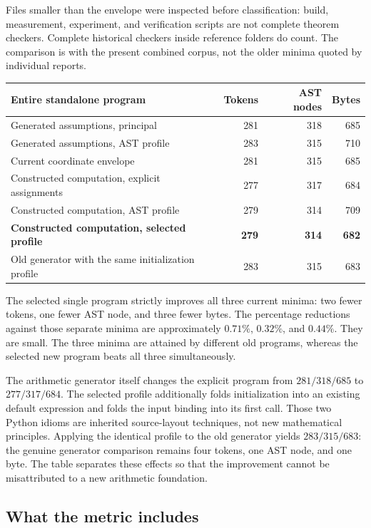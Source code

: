 \documentclass[11pt,letterpaper]{article}
\theoremstyle{definition}\newtheorem{definition}[theorem]{Definition}
\theoremstyle{remark}\newtheorem{remark}[theorem]{Remark}
\begin{document}
Files smaller than the envelope were inspected before classification:
build, measurement, experiment, and verification scripts are not complete
theorem checkers. Complete historical checkers inside reference folders
do count. The comparison is with the present combined corpus, not the
older minima quoted by individual reports.

\begin{center}\small
\begin{tabular}{lrrr}
\toprule
Entire standalone program & Tokens & AST nodes & Bytes\\
\midrule
Generated assumptions, principal\cite{generated} &281&318&685\\
Generated assumptions, AST profile\cite{generated}&283&315&710\\
Current coordinate envelope&281&315&685\\
\midrule
Constructed computation, explicit assignments&277&317&684\\
Constructed computation, AST profile&279&314&709\\
\textbf{Constructed computation, selected profile}&\textbf{279}&\textbf{314}&\textbf{682}\\
\midrule
Old generator with the same initialization profile&283&315&683\\
\bottomrule
\end{tabular}
\end{center}

The selected single program strictly improves all three current minima:
two fewer tokens, one fewer AST node, and three fewer bytes. The percentage
reductions against those separate minima are approximately $0.71\%$,
$0.32\%$, and $0.44\%$. They are small. The three minima are attained
by different old programs, whereas the selected new program beats all
three simultaneously.

The arithmetic generator itself changes the explicit program from
$281/318/685$ to $277/317/684$. The selected profile additionally folds
initialization into an existing default expression and folds the input
binding into its first call. Those two Python idioms are inherited
source-layout techniques, not new mathematical principles. Applying the
identical profile to the old generator yields $283/315/683$: the genuine
generator comparison remains four tokens, one AST node, and one byte.
The table separates these effects so that the improvement cannot be
misattributed to a new arithmetic foundation.

\subsection{What the metric includes}
\end{document}
